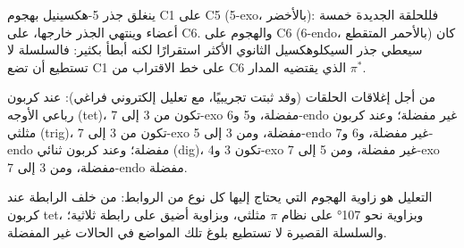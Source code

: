 \begin{omfigure}

{\small ينغلق جذر 5-هكسينيل بهجوم C1 على C5 (5-exo، بالأخضر): فللحلقة
الجديدة خمسة أعضاء وينتهي الجذر خارجها، على C6. والهجوم على C6
(6-endo، بالأحمر المتقطع) كان سيعطي جذر السيكلوهكسيل الثانوي الأكثر استقرارًا
لكنه أبطأ بكثير: فالسلسلة لا تستطيع أن تضع C1 على خط الاقتراب من C6 الذي
يقتضيه المدار $\pi^*$.}
\end{omfigure}

\begin{proposition}\label{prop:b3:radicals-carbenes:baldwin}
من أجل إغلاقات الحلقات (وقد ثبتت تجريبيًا، مع تعليل
إلكتروني فراغي): عند كربون رباعي الأوجه (tet)، تكون من 3 إلى 7-exo مفضلة، و5 
و6-endo غير مفضلة؛ وعند كربون مثلثي (trig)، تكون من 3 إلى 7-exo مفضلة، ومن 3 إلى 5-endo
غير مفضلة، و6 و7-endo مفضلة؛ وعند كربون ثنائي (dig)، تكون 3 و4-exo
غير مفضلة، ومن 5 إلى 7-exo مفضلة، ومن 3 إلى 7-endo مفضلة.
\end{proposition}

التعليل هو زاوية الهجوم التي يحتاج إليها كل نوع من الروابط: من خلف
الرابطة عند كربون tet، وبزاوية نحو 107° على نظام $\pi$ مثلثي، وبزاوية
أضيق على رابطة ثلاثية؛ والسلسلة القصيرة لا تستطيع بلوغ تلك المواضع في
الحالات غير المفضلة.

